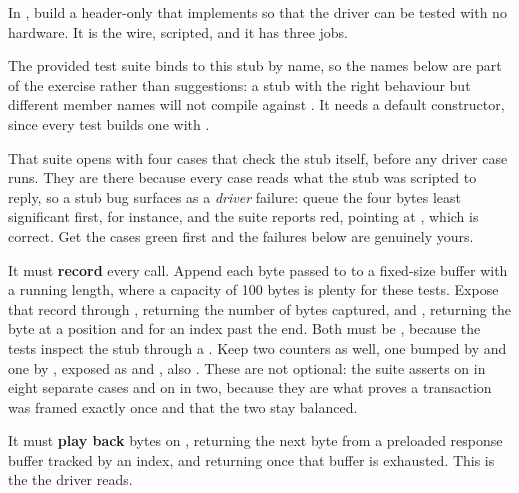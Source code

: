 \label{c8:set:1}

\label{c8:ex:1.1}
In , build a header-only  that
implements  so that the driver can be tested with no hardware. It
is the wire, scripted, and it has three jobs.

The provided test suite binds to this stub by name, so the names below are part of the exercise
rather than suggestions: a stub with the right behaviour but different member names will not compile
against . It needs a default constructor, since every test builds one
with .

That suite opens with four  cases that check the stub itself, before any driver
case runs. They are there because every  case reads what the stub was scripted to reply,
so a stub bug surfaces as a \emph{driver} failure: queue the four bytes least significant first, for
instance, and the suite reports  red, pointing at
, which is correct. Get the  cases green first and the failures
below are genuinely yours.

It must \textbf{record} every call. Append each byte passed to  to a fixed-size
 buffer with a running length, where a capacity of 100 bytes is plenty for these
tests. Expose that record through , returning the number of bytes captured, and
, returning the byte at a position and  for an index past the end. Both
must be \textbf{}, because the tests inspect the stub through a
. Keep two  counters as well, one bumped by
 and one by , exposed as  and , also
. These are not optional: the suite asserts on  in eight separate cases
and on  in two, because they are what proves a transaction was framed exactly once and that the two stay balanced.

It must \textbf{play back} bytes on , returning the next byte from a preloaded
response buffer tracked by an index, and returning  once that buffer is exhausted. This is
the  the driver reads.

